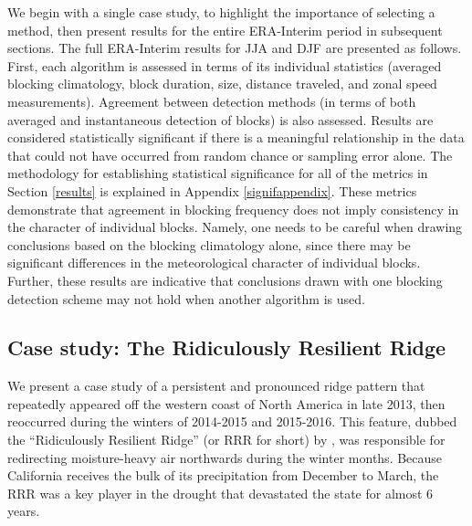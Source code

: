 \documentclass[smallextended]{svjour3}       %
\numberwithin{equation}{section}
\begin{document}
We begin with a single case study, to highlight the importance of selecting a method, then present results for the entire ERA-Interim period in subsequent sections. The full ERA-Interim results for JJA and DJF are presented as follows. First, each algorithm is assessed in terms of its individual statistics (averaged blocking climatology, block duration, size, distance traveled, and zonal speed measurements). Agreement between detection methods (in terms of both averaged and instantaneous detection of blocks) is also assessed. Results are considered statistically significant if there is a meaningful relationship in the data that could not have occurred from random chance or sampling error alone. The methodology for establishing statistical significance for all of the metrics in Section \ref{results} is explained in Appendix \ref{signifappendix}. These metrics demonstrate that agreement in blocking frequency does not imply consistency in the character of individual blocks.  Namely, one needs to be careful when drawing conclusions based on the blocking climatology alone, since there may be significant differences in the meteorological character of individual blocks.  Further, these results are indicative that conclusions drawn with one blocking detection scheme may not hold when another algorithm is used.

\subsection{Case study: The Ridiculously Resilient Ridge}\label{rrrsec}

We present a case study of a persistent and pronounced ridge pattern that repeatedly appeared off the western coast of North America in late 2013, then reoccurred during the winters of 2014-2015 and 2015-2016. This feature, dubbed the ``Ridiculously Resilient Ridge'' (or RRR for short) by \cite{swain_extraordinary_2014}, was responsible for redirecting moisture-heavy air northwards during the winter months. Because California receives the bulk of its precipitation from December to March, the RRR was a key player in the drought that devastated the state for almost 6 years. 
\end{document}
